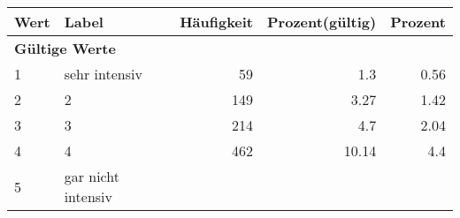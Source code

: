      \begin{longtable}{lXrrr}
     \toprule
     \textbf{Wert} & \textbf{Label} & \textbf{Häufigkeit} & \textbf{Prozent(gültig)} & \textbf{Prozent} \\
     \endhead
     \midrule
     \multicolumn{5}{l}{\textbf{Gültige Werte}}\\

     1 &
     \multicolumn{1}{X}{ sehr intensiv   } &


       \num{59} &
       \num[round-mode=places,round-precision=2]{1,3} &
         \num[round-mode=places,round-precision=2]{0,56} \\

     2 &
     \multicolumn{1}{X}{ 2   } &


       \num{149} &
       \num[round-mode=places,round-precision=2]{3,27} &
         \num[round-mode=places,round-precision=2]{1,42} \\

     3 &
     \multicolumn{1}{X}{ 3   } &


       \num{214} &
       \num[round-mode=places,round-precision=2]{4,7} &
         \num[round-mode=places,round-precision=2]{2,04} \\

     4 &
     \multicolumn{1}{X}{ 4   } &


       \num{462} &
       \num[round-mode=places,round-precision=2]{10,14} &
         \num[round-mode=places,round-precision=2]{4,4} \\

     5 &
     \multicolumn{1}{X}{ gar nicht intensiv   } &



\end{longtable}
